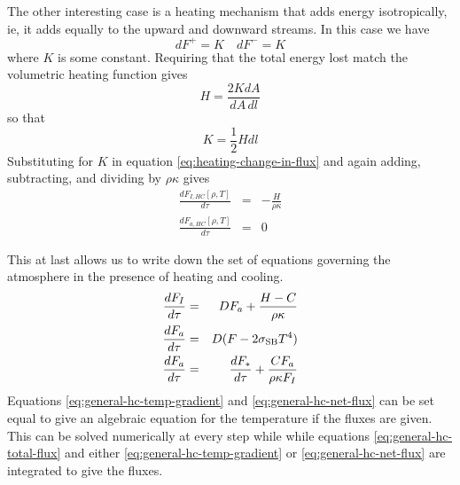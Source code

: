 \documentclass{emulateapj}
\newcommand{\fsum}{F_I}
\newcommand{\fshc}{F_{I,HC}}
\newcommand{\sigmasb}{\sigma_{\rm SB}}
\begin{document}
The other interesting case is a heating mechanism that adds energy
isotropically, ie, it adds equally to the upward and downward streams.
In this case we have
\begin{equation}
  dF^+ = K \quad dF^- = K
  \label{eq:heating-change-in-flux}
\end{equation}
where $K$ is some constant.  Requiring that the total energy lost
match the volumetric heating function gives
\begin{equation}
H = \frac{2 K dA}{dA \, dl}
\end{equation}
so that 
\begin{equation}
K =  \frac{1}{2} H dl
\end{equation}
Substituting for $K$ in equation \ref{eq:heating-change-in-flux} and
again adding, subtracting, and dividing by $\rho \kappa$ gives
\begin{eqnarray}
  \frac{d\fshc[\rho, T]}{d\tau}
  &=& -\frac{H}{\rho \kappa} \\
  \frac{dF_{a,HC}[\rho, T]}{d\tau} &=& 0
\end{eqnarray}

This at last allows us to write down the set of equations governing
the atmosphere in the presence of heating and cooling.
\begin{eqnarray}
\frac{d\fsum}{d\tau} &=& D F_a + \frac{H-C}{\rho \kappa}
\label{eq:general-hc-total-flux} \\
\frac{dF_a}{d\tau} &=& D(F - 2\sigmasb T^4)
\label{eq:general-hc-temp-gradient} \\
  \frac{dF_a}{d\tau} &=& \frac{dF_*}{d\tau} 
  +\frac{C F_a}{\rho \kappa \fsum}  
  \label{eq:general-hc-net-flux}
\end{eqnarray}
%
Equations \ref{eq:general-hc-temp-gradient} and \ref{eq:general-hc-net-flux} 
can be set equal to give an algebraic equation for the temperature if
the fluxes are given.  This can be solved numerically at every step
while while equations \ref{eq:general-hc-total-flux} and either
\ref{eq:general-hc-temp-gradient} or \ref{eq:general-hc-net-flux} are
integrated to give the fluxes.
\end{document}
